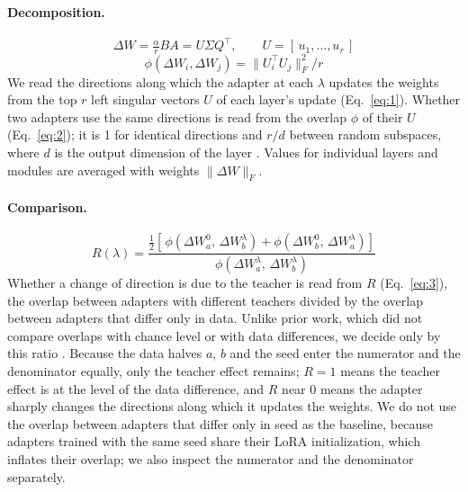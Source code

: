 \paragraph{Decomposition.}
\begin{equation}
\Delta W = \tfrac{\alpha}{r} BA = U\Sigma Q^\top, \qquad U = [\,u_1, \dots, u_r\,]
\label{eq:1}
\end{equation}
\begin{equation}
\phi(\Delta W_i, \Delta W_j) = \lVert U_i^\top U_j \rVert_F^2 / r
\label{eq:2}
\end{equation}
We read the directions along which the adapter at each $\lambda$ updates the weights from the top $r$ left singular vectors $U$ of each layer's update (Eq.~\eqref{eq:1}).
Whether two adapters use the same directions is read from the overlap $\phi$ of their $U$ (Eq.~\eqref{eq:2}); it is 1 for identical directions and $r/d$ between random subspaces, where $d$ is the output dimension of the layer \citep{hu2021lora}.
Values for individual layers and modules are averaged with weights $\lVert \Delta W \rVert_F$.

\paragraph{Comparison.}
\begin{equation}
R(\lambda) = \dfrac{\tfrac{1}{2}\left[\,\phi\!\left(\Delta W_a^{0},\, \Delta W_b^{\lambda}\right) + \phi\!\left(\Delta W_b^{0},\, \Delta W_a^{\lambda}\right)\right]}{\phi\!\left(\Delta W_a^{\lambda},\, \Delta W_b^{\lambda}\right)}
\label{eq:3}
\end{equation}
Whether a change of direction is due to the teacher is read from $R$ (Eq.~\eqref{eq:3}), the overlap between adapters with different teachers divided by the overlap between adapters that differ only in data.
Unlike prior work, which did not compare overlaps with chance level or with data differences, we decide only by this ratio \citep{dieudonne2026adapter}.
Because the data halves $a$, $b$ and the seed enter the numerator and the denominator equally, only the teacher effect remains; $R=1$ means the teacher effect is at the level of the data difference, and $R$ near 0 means the adapter sharply changes the directions along which it updates the weights.
We do not use the overlap between adapters that differ only in seed as the baseline, because adapters trained with the same seed share their LoRA initialization, which inflates their overlap; we also inspect the numerator and the denominator separately.

